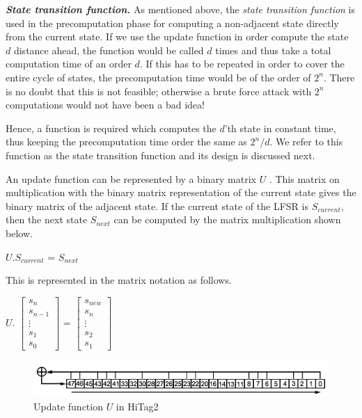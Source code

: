 \noindent \textit{\textbf{State transition function.}} As mentioned above, the \emph{state transition function} is used in the precomputation phase for computing a non-adjacent state directly from the current state. If we use the update function in order compute the state $d$ distance ahead, the function would be called $d$ times and thus take a total computation time of an order $d$. If this has to be repeated in order to cover the entire cycle of states, the precomputation time would be of the order of $2^n$. There is no doubt that this is not feasible; otherwise a brute force attack with $2^n$ computations would not have been a bad idea! 

Hence, a function is required which computes the $d$'th state in constant time, thus keeping the precomputation time order the same as $2^{n}/d$. We refer to this function as the state transition function and its design is discussed next. 

An update function can be represented by a binary matrix $U$ \cite{trappe2005icc}\cite{erik-discussions}. This matrix on multiplication with the binary matrix representation of the current state gives the binary matrix of the adjacent state. If the current state of the LFSR is $S_{current}$, then the next state $S_{next}$ can be computed by the matrix multiplication shown below.
\begin{center}
$U . S_{current}$ = $S_{next}$\\
\end{center}
This is represented in the matrix notation as follows.
\begin{center}
$U.$
$\begin{bmatrix}
s_{n} \\
s_{n-1} \\
\vdots \\
s_{1} \\
s_{0}
\end{bmatrix}$ = 
$\begin{bmatrix}
s_{new} \\
s_{n} \\
\vdots \\
s_{2} \\
s_{1}
\end{bmatrix}$
\end{center}

\begin{figure}[h!]
	\centering
	\includegraphics[width=5in]{./figures/hitag2-update-function.png}
	\caption{Update function $U$ in HiTag2}	
	\label{fig:hitag2-update-function}
\end{figure}

